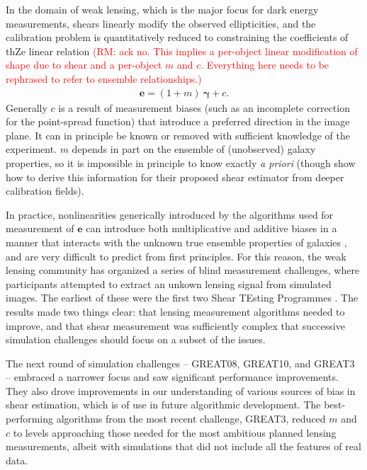 \documentclass[iop]{emulateapj}
\newcommand\rmcomment[1]{\textcolor{red}{(RM: #1)}}
\begin{document}
In the domain of weak lensing, which is the major focus for dark
energy measurements, shears linearly modify the observed
ellipticities, and the calibration problem is quantitatively reduced
to constraining the coefficients of thZe linear relation \rmcomment{ack
  no.  This implies a per-object linear modification of shape due to
  shear and a per-object $m$ and $c$.  Everything here needs to be
  rephrased to refer to ensemble relationships.}
\begin{align}
\boldsymbol{e} = (1+m)\:\boldsymbol{\gamma} + c.
\end{align}
Generally $c$ is a result of measurement biases (such as an incomplete
correction for the point-spread function) that introduce a preferred
direction in the image plane. It can in principle be known or removed
with sufficient knowledge of the experiment. $m$ depends in part on
the ensemble of (unobserved) galaxy properties, so it is impossible in
principle to know exactly {\it a priori} (though
\citealt{2014MNRAS.438.1880B} show how to derive this information for
their proposed shear estimator from deeper calibration fields).

In practice, nonlinearities generically introduced by the algorithms
used for measurement of $\boldsymbol{e}$ can introduce both
multiplicative and additive biases in a manner that interacts with the
unknown true ensemble properties of galaxies
\citep{2007MNRAS.380..229M,2011MNRAS.414.1047Z}, and are very
difficult to predict from first principles. For this reason, the weak
lensing community has organized a series of blind measurement
challenges, where participants attempted to extract an unkown lensing
signal from simulated images.  The earliest of these were the first
two Shear TEsting Programmes \citep[STEP1,
STEP2]{2006MNRAS.368.1323H,2007MNRAS.376...13M}. The results made two
things clear: that lensing measurement algorithms needed to improve,
and that shear measurement was sufficiently complex that successive
simulation challenges should focus on a subset of the issues.

The next round of simulation challenges -- GREAT08, GREAT10, and GREAT3
\citep{2009AnApS...3....6B,2013ApJS..205...12K, 2015MNRAS.450.2963M} --
embraced a narrower focus and saw significant performance
improvements. They also drove improvements in our understanding of 
various sources of bias in shear estimation, which is of use in future algorithmic development.  The best-performing algorithms from the
most recent challenge, GREAT3, reduced $m$ and $c$ to
levels approaching those needed for the most ambitious planned
lensing measurements, albeit with simulations that did not include all the features of real data.
\end{document}
